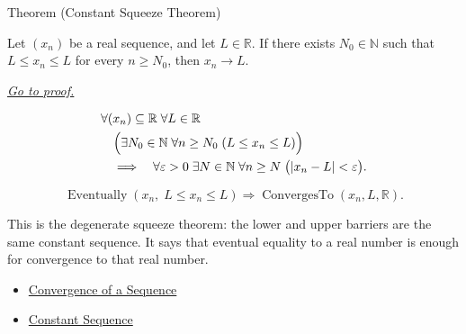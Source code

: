 \begin{theorembox}{Theorem (Constant Squeeze Theorem)}
\begin{theorem}
\label{thm:constant-squeeze-theorem}

Let $(x_n)$ be a real sequence, and let $L\in\mathbb{R}$. If there
exists $N_0\in\mathbb{N}$ such that $L\le x_n\le L$ for every
$n\ge N_0$, then $x_n\to L$.

\smallskip
\noindent
\hyperref[prf:constant-squeeze-theorem]{\textit{Go to proof.}}
\end{theorem}
\end{theorembox}

\begin{remark*}
\[
\begin{aligned}
&\forall (x_n)\subseteq\mathbb{R}\;\forall L\in\mathbb{R}\\
&\quad\Bigl(
  \exists N_0\in\mathbb{N}\;\forall n\ge N_0\;(L\le x_n\le L)
\Bigr)\\
&\quad\Longrightarrow\quad
\forall \varepsilon>0\;\exists N\in\mathbb{N}\;\forall n\ge N\;
\bigl(|x_n-L|<\varepsilon\bigr).
\end{aligned}
\]
\end{remark*}

\begin{remark*}
\[
\operatorname{Eventually}(x_n,\;L\le x_n\le L)
\Longrightarrow
\operatorname{ConvergesTo}(x_n,L,\mathbb{R}).
\]
\end{remark*}

\begin{remark*}[Interpretation]
This is the degenerate squeeze theorem: the lower and upper barriers are the
same constant sequence. It says that eventual equality to a real number is
enough for convergence to that real number.
\end{remark*}

\begin{dependencies}
\begin{itemize}
  \item \hyperref[def:convergent-sequence]{Convergence of a Sequence}
  \item \hyperref[def:constant-sequence]{Constant Sequence}
\end{itemize}
\end{dependencies}


